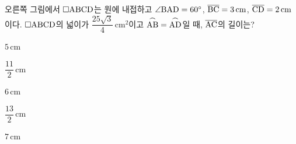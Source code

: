 \noindent\begin{minipage}[t]{0.58\linewidth}\vspace{0pt}\raggedright 오른쪽 그림에서 $\square\mathrm{ABCD}$는 원에 내접하고 $\angle\mathrm{BAD}=60^\circ$, $\overline{\mathrm{BC}}=3\,\mathrm{cm}$, $\overline{\mathrm{CD}}=2\,\mathrm{cm}$이다. $\square\mathrm{ABCD}$의 넓이가 $\dfrac{25\sqrt{3}}{4}\,\mathrm{cm}^2$이고 $\overset{\frown}{\mathrm{AB}}=\overset{\frown}{\mathrm{AD}}$일 때, $\overline{\mathrm{AC}}$의 길이는?\end{minipage}\hfill\begin{minipage}[t]{0.4\linewidth}\vspace{0pt}\centering \resizebox{\ifdim\width>\linewidth\linewidth\else\width\fi}{!}{}\end{minipage}\par
\begin{choices32}{\rule[-3ex]{0pt}{8ex}$5\,\mathrm{cm}$}{\rule[-3ex]{0pt}{8ex}$\dfrac{11}{2}\,\mathrm{cm}$}{\rule[-3ex]{0pt}{8ex}$6\,\mathrm{cm}$}{\rule[-3ex]{0pt}{8ex}$\dfrac{13}{2}\,\mathrm{cm}$}{\rule[-3ex]{0pt}{8ex}$7\,\mathrm{cm}$}\end{choices32}
